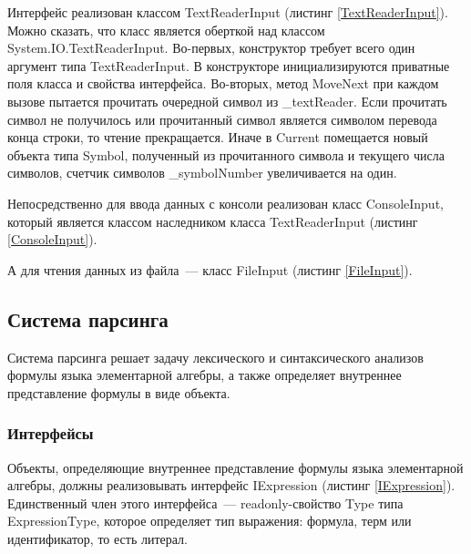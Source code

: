Интерфейс реализован классом TextReaderInput (листинг \ref{TextReaderInput}). Можно сказать, что класс является оберткой над классом System.IO.TextReaderInput. Во-первых, конструктор требует всего один аргумент типа TextReaderInput. В конструкторе инициализируются приватные поля класса и свойства интерфейса. Во-вторых, метод MoveNext при каждом вызове пытается прочитать очередной символ из \_textReader. Если прочитать символ не получилось или прочитанный символ является символом перевода конца строки, то чтение прекращается. Иначе в Current помещается новый объекта типа Symbol, полученный из прочитанного символа и текущего числа символов, счетчик символов \_symbolNumber увеличивается на один.



Непосредственно для ввода данных с консоли реализован класс ConsoleInput, который является классом наследником класса TextReaderInput (листинг \ref{ConsoleInput}).



А для чтения данных из файла~--- класс FileInput  (листинг \ref{FileInput}).



\subsection{Система парсинга}


Система парсинга решает задачу лексического и синтаксического анализов формулы языка элементарной алгебры, а также определяет внутреннее представление формулы в виде объекта.


\subsubsection{Интерфейсы}

Объекты, определяющие внутреннее представление формулы языка элементарной алгебры, должны реализовывать интерфейс IExpression (листинг \ref{IExpression}). Единственный член этого интерфейса~--- readonly-свойство Type типа ExpressionType, которое определяет тип выражения: формула, терм или идентификатор, то есть литерал.


